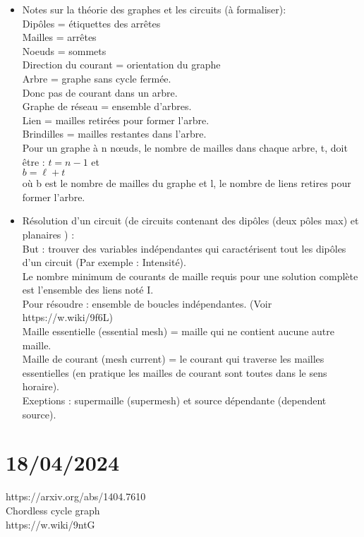 \documentclass[11pt]{article}
\begin{document}
    \begin{itemize}
	    \item Notes sur la théorie des graphes et les circuits (à formaliser): \\
   Dipôles = étiquettes des arrêtes \\
   Mailles = arrêtes \\
   Noeuds = sommets \\
   Direction du courant = orientation du graphe \\
   
   Arbre = graphe sans cycle fermée. \\
   Donc pas de courant dans un arbre. \\
   Graphe de réseau = ensemble d'arbres. \\
   Lien = mailles retirées pour former l'arbre. \\
   Brindilles = mailles restantes dans l'arbre. \\
   Pour un graphe à n nœuds, le nombre de mailles dans chaque arbre, t, doit être : 
   $\displaystyle t=n-1 $ et \\ 
   $\displaystyle b=\ell +t $ \\
   où b est le nombre de mailles du graphe et l, le nombre de liens 
   retires pour former l'arbre. \\

	\item Résolution d'un circuit (de circuits contenant des dipôles (deux pôles max) et planaires ) : \\
   But : trouver des variables indépendantes qui caractérisent tout les dipôles d'un circuit (Par exemple : Intensité). \\
   Le nombre minimum de courants de maille requis pour une solution complète est l'ensemble des liens noté I. \\
   Pour résoudre : ensemble de boucles indépendantes. (Voir https://w.wiki/9f6L) \\
   Maille essentielle (essential mesh) = maille qui ne contient aucune autre maille. \\
   Maille de courant (mesh current) = le courant qui traverse les mailles essentielles (en pratique les mailles de courant sont toutes dans le sens horaire). \\
   Exeptions : supermaille (supermesh) et source dépendante (dependent source). \\
    \end{itemize}
\section{18/04/2024}
 https://arxiv.org/abs/1404.7610 \\
Chordless cycle graph \\
https://w.wiki/9ntG \\
\end{document}

